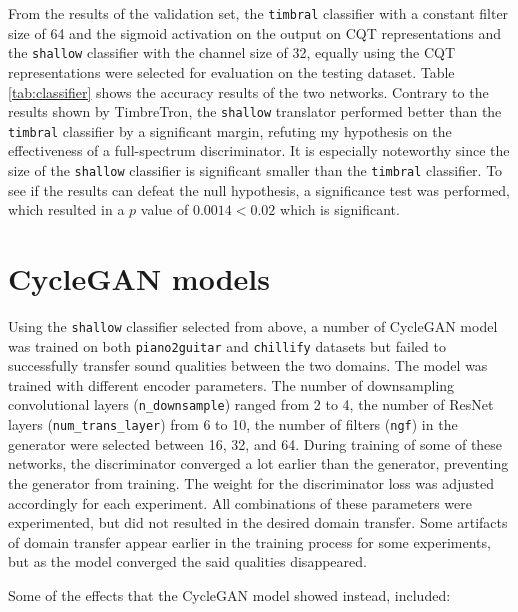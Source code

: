 \documentclass[12pt,a4paper,]{report}
\begin{document}
From the results of the validation set, the \texttt{timbral} classifier
with a constant filter size of 64 and the sigmoid activation on the
output on CQT representations and the \texttt{shallow} classifier with
the channel size of 32, equally using the CQT representations were
selected for evaluation on the testing dataset. Table
\ref{tab:classifier} shows the accuracy results of the two networks.
Contrary to the results shown by TimbreTron, the \texttt{shallow}
translator performed better than the \texttt{timbral} classifier by a
significant margin, refuting my hypothesis on the effectiveness of a
full-spectrum discriminator. It is especially noteworthy since the size
of the \texttt{shallow} classifier is significant smaller than the
\texttt{timbral} classifier. To see if the results can defeat the null
hypothesis, a significance test was performed, which resulted in a \(p\)
value of \(0.0014 < 0.02\) which is significant.

\hypertarget{cyclegan-models}{%
\section{CycleGAN models}\label{cyclegan-models}}

Using the \texttt{shallow} classifier selected from above, a number of
CycleGAN model was trained on both \texttt{piano2guitar} and
\texttt{chillify} datasets but failed to successfully transfer sound
qualities between the two domains. The model was trained with different
encoder parameters. The number of downsampling convolutional layers
(\texttt{n\_downsample}) ranged from 2 to 4, the number of ResNet layers
(\texttt{num\_trans\_layer}) from 6 to 10, the number of filters
(\texttt{ngf}) in the generator were selected between 16, 32, and 64.
During training of some of these networks, the discriminator converged a
lot earlier than the generator, preventing the generator from training.
The weight for the discriminator loss was adjusted accordingly for each
experiment. All combinations of these parameters were experimented, but
did not resulted in the desired domain transfer. Some artifacts of
domain transfer appear earlier in the training process for some
experiments, but as the model converged the said qualities disappeared.

Some of the effects that the CycleGAN model showed instead, included:
\end{document}
